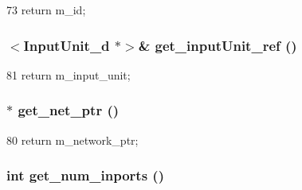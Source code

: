 \begin{DoxyCode}
73 { return m_id; }
\end{DoxyCode}
\hypertarget{classRouter__d_a5b233acca0e7233c784c1a4438daccba}{
\subsubsection[{get\_\-inputUnit\_\-ref}]{$<${\bf InputUnit\_\-d} $\ast$$>$\& get\_\-inputUnit\_\-ref ()}}
\label{classRouter__d_a5b233acca0e7233c784c1a4438daccba}



\begin{DoxyCode}
81 { return m_input_unit; }
\end{DoxyCode}
\hypertarget{classRouter__d_ab3cf04100769b695a462a6d08ef5f49d}{
\subsubsection[{get\_\-net\_\-ptr}]{$\ast$ get\_\-net\_\-ptr ()}}
\label{classRouter__d_ab3cf04100769b695a462a6d08ef5f49d}



\begin{DoxyCode}
80 { return m_network_ptr; }
\end{DoxyCode}
\hypertarget{classRouter__d_a4240599a90efd3e64dfb481ee674a3fd}{
\subsubsection[{get\_\-num\_\-inports}]{\setlength{\rightskip}{0pt plus 5cm}int get\_\-num\_\-inports ()}}
\label{classRouter__d_a4240599a90efd3e64dfb481ee674a3fd}



